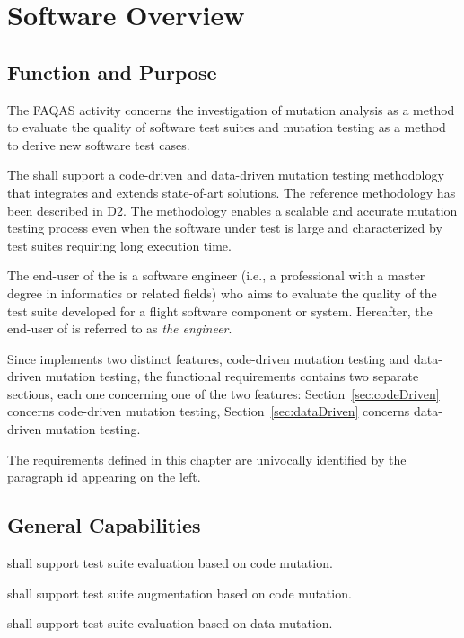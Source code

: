 
\chapter{Software Overview}
\label{chapter:overview}

\section{Function and Purpose}

The FAQAS activity concerns the investigation of mutation analysis as a method to evaluate the quality of software test suites and mutation testing as a method to derive new software test cases. 

The \FAQAS shall support a code-driven and data-driven mutation testing methodology that integrates and extends state-of-art solutions. The reference methodology has been described in D2. The methodology enables a scalable and accurate mutation testing process even when the software under test is large and characterized by test suites requiring long execution time.

The end-user of the \FAQAS is a software engineer (i.e., a professional with a master degree in informatics or related fields)  who aims to evaluate the quality of the test suite developed for a flight software component or system. Hereafter, the end-user of \FAQAS is referred to as \emph{the engineer}.

Since \FAQAS implements two distinct features, code-driven mutation testing and data-driven mutation testing, the functional requirements contains two separate sections, each one concerning one of the two features: Section~\ref{sec:codeDriven} concerns code-driven mutation testing, Section~\ref{sec:dataDriven} concerns data-driven mutation testing.

The requirements defined in this chapter are univocally identified by the paragraph id appearing on the left.

\section{General Capabilities}

\RQ{} \FAQAS shall support test suite evaluation based on code mutation.

\RQ{} \FAQAS shall support test suite augmentation based on code mutation.

\RQ{} \FAQAS shall support test suite evaluation based on data mutation.

